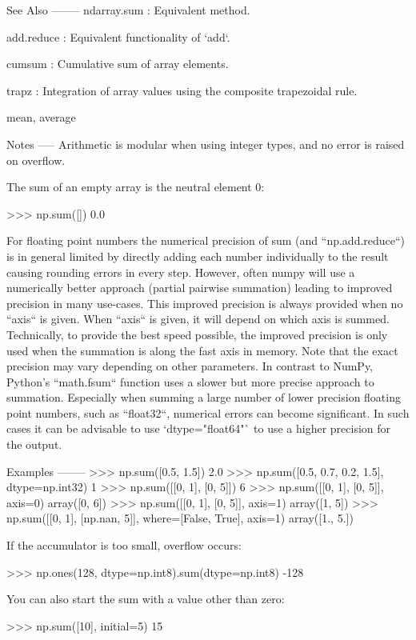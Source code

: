 \begin{DoxyVerb}
See Also
--------
ndarray.sum : Equivalent method.

add.reduce : Equivalent functionality of `add`.

cumsum : Cumulative sum of array elements.

trapz : Integration of array values using the composite trapezoidal rule.

mean, average

Notes
-----
Arithmetic is modular when using integer types, and no error is
raised on overflow.

The sum of an empty array is the neutral element 0:

>>> np.sum([])
0.0

For floating point numbers the numerical precision of sum (and
``np.add.reduce``) is in general limited by directly adding each number
individually to the result causing rounding errors in every step.
However, often numpy will use a  numerically better approach (partial
pairwise summation) leading to improved precision in many use-cases.
This improved precision is always provided when no ``axis`` is given.
When ``axis`` is given, it will depend on which axis is summed.
Technically, to provide the best speed possible, the improved precision
is only used when the summation is along the fast axis in memory.
Note that the exact precision may vary depending on other parameters.
In contrast to NumPy, Python's ``math.fsum`` function uses a slower but
more precise approach to summation.
Especially when summing a large number of lower precision floating point
numbers, such as ``float32``, numerical errors can become significant.
In such cases it can be advisable to use `dtype="float64"` to use a higher
precision for the output.

Examples
--------
>>> np.sum([0.5, 1.5])
2.0
>>> np.sum([0.5, 0.7, 0.2, 1.5], dtype=np.int32)
1
>>> np.sum([[0, 1], [0, 5]])
6
>>> np.sum([[0, 1], [0, 5]], axis=0)
array([0, 6])
>>> np.sum([[0, 1], [0, 5]], axis=1)
array([1, 5])
>>> np.sum([[0, 1], [np.nan, 5]], where=[False, True], axis=1)
array([1., 5.])

If the accumulator is too small, overflow occurs:

>>> np.ones(128, dtype=np.int8).sum(dtype=np.int8)
-128

You can also start the sum with a value other than zero:

>>> np.sum([10], initial=5)
15
\end{DoxyVerb}
 \mbox{\label{namespacenumpy_1_1core_1_1fromnumeric_a40f6b355d941bebebf7e12e2dfd7c3af}} 
